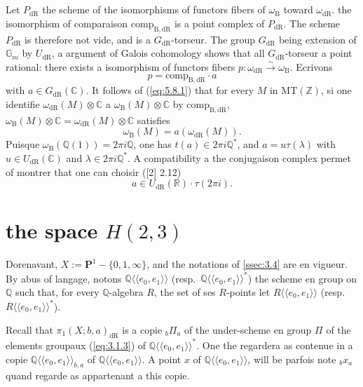 \documentclass[11pt,a4paper]{article}
\theoremstyle{plain}
\theoremstyle{definition}
\newcommand{\Z}{\mathbb{Z}}
\newcommand{\Q}{\mathbb{Q}}
\newcommand{\R}{\mathbb{R}}
\newcommand{\C}{\mathbb{C}}
\newcommand{\Gm}{\mathbb{G}_m}
\newcommand{\dR}{\mathrm{dR}}
\newcommand{\B}{\mathrm{B}}
\newcommand{\comp}{\mathrm{comp}}
\newcommand{\MT}{\mathrm{MT}}
\begin{document}
\subsection{}\label{ssec:5.8}

Let $P_{\dR}$ the scheme of the isomorphisms of functors fibers of $\omega_{\B}$ toward $\omega_{\dR}$. the isomorphism of comparaison $\comp_{\B,\dR}$ is a point complex of $P_{\dR}$. The scheme $P_{\dR}$ is therefore not vide, and is a $G_{\dR}$-torseur. The group $G_{\dR}$ being extension of $\Gm$ by $U_{\dR}$, a argument of Galois cohomology shows that all $G_{\dR}$-torseur a point rational: there exists a isomorphism of functors fibers $p: \omega_{\dR} \xrightarrow{\sim} \omega_{\B}$. Ecrivons
\begin{equation}\label{eq:5.8.1}
p = \comp_{\B,\dR} \cdot a
\end{equation}
with $a \in G_{\dR}(\C)$. It follows of (\ref{eq:5.8.1}) that for every $M$ in $\MT(\Z)$, si one identifie $\omega_{\dR}(M) \otimes \C$ a $\omega_{\B}(M) \otimes \C$ by $\comp_{\B,\dR}$, $\omega_{\B}(M) \otimes \C = \omega_{\dR}(M) \otimes \C$ satisfies
\begin{equation}\label{eq:5.8.2}
\omega_{\B}(M) = a(\omega_{\dR}(M)).
\end{equation}
Puisque $\omega_{\B}(\Q(1)) = 2\pi i \Q$, one has $t(a) \in 2\pi i \Q^*$, and $a = u \tau(\lambda)$ with $u \in U_{\dR}(\C)$ and $\lambda \in 2\pi i \Q^*$. A compatibility a the conjugaison complex permet of montrer that one can choisir ([2] 2.12)
\begin{equation}\label{eq:5.8.3}
a \in U_{\dR}(\R) \cdot \tau(2\pi i).
\end{equation}

\section{the space $H(2,3)$}\label{sec:6}

Dorenavant, $X := \mathbf{P}^1 - \{0,1,\infty\}$, and the notations of \ref{ssec:3.4} are en vigueur. By abus of langage, notons $\Q\langle\langle e_0,e_1 \rangle\rangle$ (resp.~$\Q\langle\langle e_0,e_1 \rangle\rangle^*$) the scheme en group on $\Q$ such that, for every $\Q$-algebra $R$, the set of ses $R$-points let $R\langle\langle e_0,e_1 \rangle\rangle$ (resp.~$R\langle\langle e_0,e_1 \rangle\rangle^*$).

Recall that $\pi_1(X;b,a)_{\dR}$ is a copie ${}_b\Pi_a$ of the under-scheme en group $\Pi$ of the elements groupaux (\ref{eq:3.1.3}) of $\Q\langle\langle e_0,e_1 \rangle\rangle^*$. One the regardera as contenue in a copie $\Q\langle\langle e_0,e_1 \rangle\rangle_{b,a}$ of $\Q\langle\langle e_0,e_1 \rangle\rangle$. A point $x$ of $\Q\langle\langle e_0,e_1 \rangle\rangle$, will be parfois note ${}_b x_a$ quand regarde as appartenant a this copie.
\end{document}
